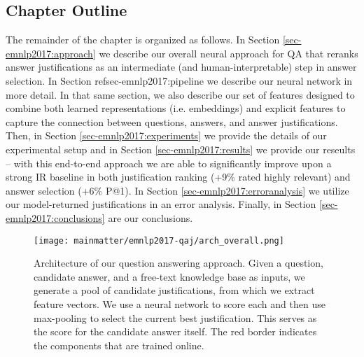 \subsection{Chapter Outline}
The remainder of the chapter is organized as follows.  In Section \ref{sec-emnlp2017:approach} we describe our overall neural approach for QA that reranks answer justifications as an intermediate (and human-interpretable) step in answer selection. In Section ref{sec-emnlp2017:pipeline} we describe our neural network in more detail.  In that same section, we also describe our set of features designed to combine both learned representations (i.e. embeddings) and explicit features to capture the connection between questions, answers, and answer justifications.  Then, in Section \ref{sec-emnlp2017:experiments} we provide the details of our experimental setup and in Section \ref{sec-emnlp2017:results} we provide our reseults -- with this end-to-end approach we are able to significantly improve upon a strong IR baseline in both justification ranking (+9\% rated highly relevant) and answer selection (+6\% P@1).  In Section \ref{sec-emnlp2017:erroranalysis} we utilize our model-returned justifications in an error analysis.  Finally, in Section \ref{sec-emnlp2017:conclusions} are our conclusions.




\begin{figure}[t]
\begin{center}
\texttt{[image: mainmatter/emnlp2017-qaj/arch\_overall.png]}
\caption{ Architecture of our question answering approach.  
Given a question, candidate answer, and a free-text knowledge base as inputs, we generate a pool of candidate justifications, from which we extract feature vectors.  We use a neural network to score each and then use max-pooling to select the current best justification. This serves as the score for the candidate answer itself.  The red border indicates the components that are trained online. }
\label{fig:arch_overall}
\end{center}
\end{figure}

